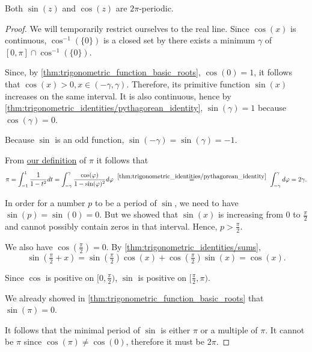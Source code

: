 \begin{theorem}\label{thm:trigonometric_function_period}
  Both \( \sin(z) \) and \( \cos(z) \) are \( 2\pi \)-periodic.
\end{theorem}
\begin{proof}
  We will temporarily restrict ourselves to the real line. Since \( \cos(x) \) is continuous, \( \cos^{-1}(\{ 0 \}) \) is a closed set by  there exists a minimum \( \gamma \) of \( [0, \pi] \cap \cos^{-1}(\{ 0 \}) \).

  Since, by \cref{thm:trigonometric_function_basic_roots}, \( \cos(0) = 1 \), it follows that \( \cos(x) > 0, x \in (-\gamma, \gamma) \). Therefore, its primitive function \( \sin(x) \) increases on the same interval. It is also continuous, hence by \cref{thm:trigonometric_identities/pythagorean_identity}, \( \sin(\gamma) = 1 \) because \( \cos(\gamma) = 0 \).

  Because \( \sin \) is an odd function, \( \sin(-\gamma) = \sin(\gamma) = -1 \).

  From \hyperref[def:pi]{our definition} of \( \pi \) it follows that
  \begin{equation*}
    \pi
    =
    \int_{-1}^1 \frac 1 {1 - t^2} dt
    =
    \int_{-\gamma}^\gamma \frac {\cos(\varphi)} {1 - \sin(\varphi)^2} d\varphi
    \reloset {\ref{thm:trigonometric_identities/pythagorean_identity}} =
    \int_{-\gamma}^\gamma d\varphi
    =
    2\gamma.
  \end{equation*}

  In order for a number \( p \) to be a period of \( \sin \), we need to have \( \sin(p) = \sin(0) = 0 \). But we showed that \( \sin(x) \) is increasing from \( 0 \) to \( \tfrac \pi 2 \) and cannot possibly contain zeros in that interval. Hence, \( p > \tfrac \pi 2 \).

  We also have \( \cos(\tfrac \pi 2) = 0 \). By \cref{thm:trigonometric_identities/sums},
  \begin{equation*}
    \sin(\tfrac \pi 2 + x)
    =
    \sin(\tfrac \pi 2) \cos(x) + \cos(\tfrac \pi 2) \sin(x)
    =
    \cos(x).
  \end{equation*}

  Since \( \cos \) is positive on \( [0, \tfrac \pi 2) \), \( \sin \) is positive on \( [\tfrac \pi 2, \pi) \).

  We already showed in \cref{thm:trigonometric_function_basic_roots} that \( \sin(\pi) = 0 \).

  It follows that the minimal period of \( \sin \) is either \( \pi \) or a multiple of \( \pi \). It cannot be \( \pi \) since \( \cos(\pi) \neq \cos(0) \), therefore it must be \( 2\pi \).
\end{proof}


